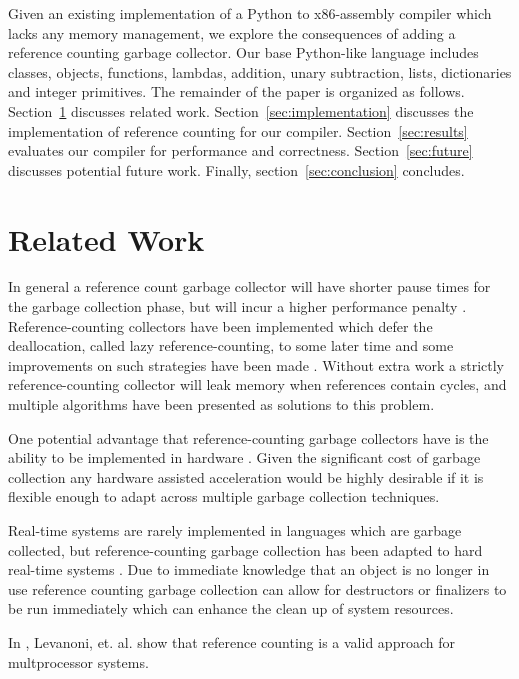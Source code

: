 \documentclass{sigplanconf}
\begin{document}
Given an existing implementation of a Python to x86-assembly compiler which lacks any memory management, we explore the consequences of adding a reference counting garbage collector.  Our base Python-like language includes classes, objects, functions, lambdas, addition, unary subtraction, lists, dictionaries and integer primitives.  The remainder of the paper is organized as follows.  Section~\ref{sec:related} discusses related work.  Section~\ref{sec:implementation} discusses the implementation of reference counting for our compiler.  Section~\ref{sec:results} evaluates our compiler for performance and correctness.  Section~\ref{sec:future} discusses potential future work.  Finally, section~\ref{sec:conclusion} concludes.


\section{Related Work}
\label{sec:related}
In general a reference count garbage collector will have shorter pause times for the garbage collection phase, but will incur a higher performance penalty \cite{joisha}\cite{blackburn}.  Reference-counting collectors have been implemented which defer the deallocation, called lazy reference-counting, to some later time and some improvements on such strategies have been made \cite{boehm}.  Without extra work a strictly reference-counting collector will leak memory when references contain cycles, and multiple algorithms have been presented as solutions to this problem. \cite{lin}\cite{trancon}

One potential advantage that reference-counting garbage collectors have is the ability to be implemented in hardware \cite{joao}.  Given the significant cost of garbage collection \cite{hertz} any hardware assisted acceleration would be highly desirable if it is flexible enough to adapt across multiple garbage collection techniques. 

Real-time systems are rarely implemented in languages which are garbage collected, but reference-counting garbage collection has been adapted to hard real-time systems \cite{ritzaou}.  Due to immediate knowledge that an object is no longer in use reference counting garbage collection can allow for destructors or finalizers to be run immediately which can enhance the clean up of system resources.

In \cite{levanoni}, Levanoni, et. al. show that reference counting is a valid approach for multprocessor systems.

\par
\end{document}
